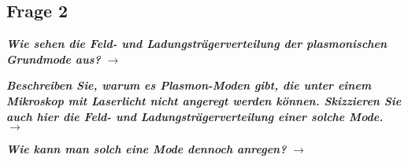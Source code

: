 \subsection{\label{subsec:FZV2}Frage 2}
\textbf{\textit{Wie sehen die Feld- und Ladungsträgerverteilung der plasmonischen Grundmode aus?}}
$\rightarrow$

\textbf{\textit{Beschreiben Sie, warum es Plasmon-Moden gibt, die unter einem Mikroskop
mit Laserlicht nicht angeregt werden können. Skizzieren Sie auch hier die Feld- und
Ladungsträgerverteilung einer solche Mode.}}
$\rightarrow$

\textbf{\textit{Wie kann man solch eine Mode dennoch anregen?}}
$\rightarrow$